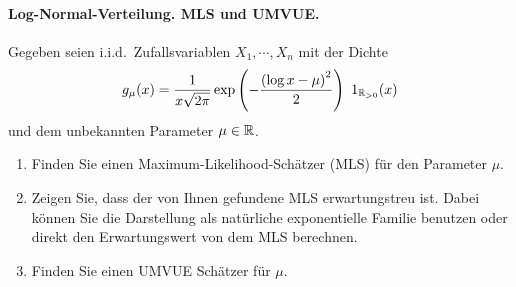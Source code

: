\paragraph{Log-Normal-Verteilung. MLS und UMVUE. }
Gegeben seien i.i.d.\ Zufallsvariablen $X_1, \cdots, X_n$  mit der Dichte
\begin{equation*}
    g_{\mu}(x) = \frac{1}{x \sqrt{2\pi}} \exp \left( - \frac{ \left( \log x - \mu \right)^2 }{2} \right) \ 1_{\mathbb R_{>0}}(x)
\end{equation*}
und dem unbekannten Parameter $\mu \in \mathbb R$. 
\begin{enumerate}
    \item Finden Sie einen Maximum-Likelihood-Schätzer (MLS) für den Parameter $\mu$. 
    \item Zeigen Sie, dass der von Ihnen gefundene MLS erwartungstreu ist.
        Dabei können Sie die Darstellung als natürliche exponentielle
        Familie benutzen oder direkt den Erwartungswert von dem MLS berechnen. 
    \item Finden Sie einen UMVUE Schätzer für $\mu$. 
\end{enumerate}

